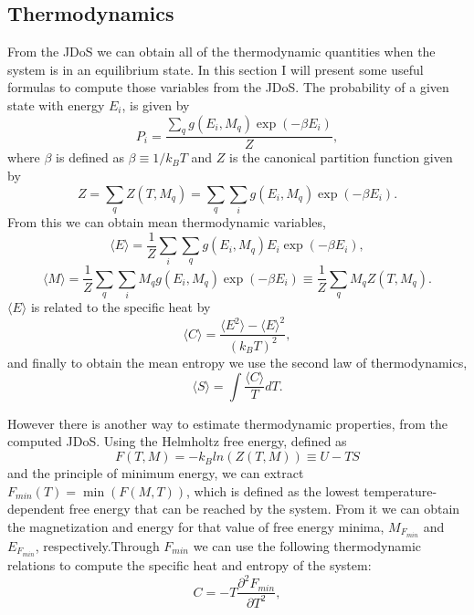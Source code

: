 \subsection{Thermodynamics}

From the JDoS we can obtain all of the thermodynamic quantities when the system is in an equilibrium state. In this section I will present some useful formulas to compute those variables from the JDoS. 
The probability of a given state with energy $E_i$, is given by
\begin{equation}
	P_i = \frac{\sum_q g(E_i, M_q) \exp(-\beta E_i)}{Z},
\end{equation}
where $\beta$ is defined as $\beta \equiv 1/k_BT$ and $Z$ is the canonical partition function given by
\begin{equation}
	Z = \sum_q Z(T, M_q) = \sum_q \sum_i g(E_i, M_q) \exp(-\beta E_i).
\end{equation}
From this we can obtain mean thermodynamic variables, 
\begin{equation}
	\langle E \rangle = \frac{1}{Z} \sum_i \sum_q  g(E_i, M_q) E_i \exp(-\beta E_i),
\end{equation}
\begin{equation}
	\langle M \rangle  = \frac{1}{Z} \sum_q \sum_i M_q g(E_i, M_q) \exp(-\beta E_i) \equiv \frac{1}{Z} \sum_q M_q Z(T, M_q).
\end{equation}
$\langle E \rangle$ is related to the specific heat by 
\begin{equation}
	\langle C \rangle = \frac{\langle E^2 \rangle - \langle E \rangle^2}{\left( k_BT \right)^2},
\end{equation}
and finally to obtain the mean entropy we use the second law of thermodynamics,
\begin{equation}
	\langle S \rangle= \int \frac{\langle C \rangle}{T} dT.
\end{equation}

\pagebreak

However there is another way to estimate thermodynamic properties, from the computed JDoS.  Using the Helmholtz free energy, defined as 
\begin{equation}
	F(T, M) = - k_B ln(Z(T, M)) \equiv U - TS
\end{equation}
and the principle of minimum energy, we can extract $F_{min} (T) = \min(F(M, T))$, which is defined as the lowest temperature-dependent free energy that can be reached by the system.
From it we can obtain the magnetization and energy for that value of free energy minima, $M_{F_{min}}$ and $E_{F_{min}}$, respectively.Through $F_{min}$ we can use the following thermodynamic relations to compute the specific heat and entropy of the system:
\begin{equation}
	C = - T \frac{\partial^2 F_{min}}{\partial T^2},
\end{equation}

